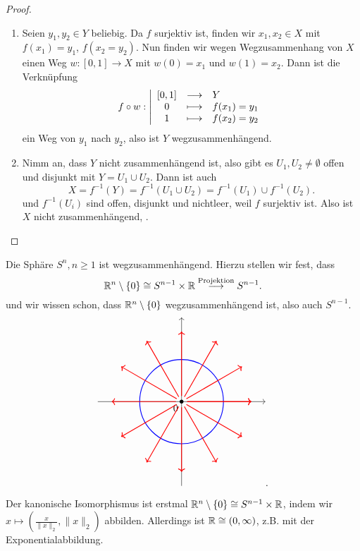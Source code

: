 \begin{proof}
    \begin{enumerate}[1)]
        \item Seien $y_1,y_2\in Y$ beliebig. Da $f$ surjektiv ist, finden wir  $x_1,x_2\in X$ mit $f(x_1) = y_1$, $f(x_2=y_2)$. Nun finden wir wegen Wegzusammenhang von $X$ einen Weg  $w: [0,1] \to X$ mit $w(0) = x_1$ und $w(1) = x_2$. Dann ist die Verknüpfung
                \begin{equation*}
                f \circ  w: \left| \begin{array}{c c l} 
                    [0,1] & \longrightarrow & Y \\
                    0 & \longmapsto &  f(x_1) = y_1 \\
                    1 & \longmapsto & f(x_2) = y_2
                \end{array} \right.
            \end{equation*}
            ein Weg von $y_1$ nach $y_2$, also ist $Y$ wegzusammenhängend.
        \item Nimm an, dass $Y$ nicht zusammenhängend ist, also gibt es  $U_1,U_2\neq \emptyset$ offen und disjunkt mit $Y = U_1 \cup U_2$. Dann ist auch
            \[
                X = f^{-1}(Y) = f^{-1}(U_1\cup U_2) = f^{-1}(U_1) \cup f^{-1}(U_2)
            .\] 
            und $f^{-1}(U_i)$ sind offen, disjunkt und nichtleer, weil $f$ surjektiv ist. Also ist $X$ nicht zusammenhängend, \contra.
    \end{enumerate}
\end{proof}

\begin{example}
    Die Sphäre $S^n, n\geq 1$ ist wegzusammenhängend. Hierzu stellen wir fest, dass
    \[
        \mathbb{R}^n \setminus \left \{0\right\}  \cong S^{n-1}\times \mathbb{R} \stackrel{\text{Projektion}}{\longrightarrow} S^{n-1}
    .\] 
und wir wissen schon, dass $\mathbb{R}^n \setminus \left \{0\right\}$ wegzusammenhängend ist, also auch $S^{n-1}$.
\[
\begin{tikzpicture}
    \draw[->] (-3,0) -- (3,0);
    \draw[->] (0,-3) -- (0,3) node[midway, anchor = north east] {$0$};
    \fill (0,0) circle (2pt);
    \draw[blue, thick] (0,0) circle (1.5);
    \foreach \x in {0,...,12} {
        \draw[red,thick,->] (\x*30:0.2) -- (\x*30:2.5);
    }
\end{tikzpicture}
.\] 
\end{example}

\begin{remark*}
    Der kanonische Isomorphismus ist erstmal $\mathbb{R}^n \setminus \left \{0\right\}  \cong S^{n-1}\times \mathbb{R}$, indem wir $x \mapsto \left( \frac{x}{\lVert x \rVert_2 },\lVert x \rVert _2 \right) $ abbilden. Allerdings ist $\mathbb{R} \cong (0,\infty)$, z.B. mit der Exponentialabbildung.
\end{remark*}


